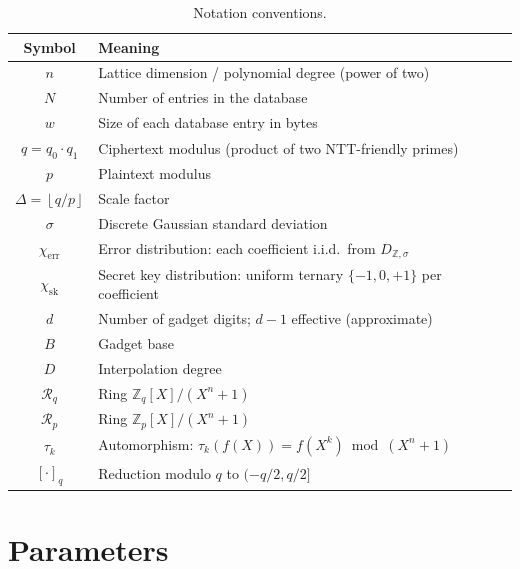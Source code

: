 \documentclass[11pt,a4paper]{article}
\newcommand{\Z}{\mathbb{Z}}
\newcommand{\R}{\mathcal{R}}
\newcommand{\Rq}{\R_{q}}
\newcommand{\Rp}{\R_{p}}
\newcommand{\floor}[1]{\left\lfloor #1 \right\rfloor}
\begin{document}
\begin{table}[ht]\centering
\caption{Notation conventions.}\label{tab:notation}
\begin{tabular}{@{}cl@{}}
\toprule
\textbf{Symbol} & \textbf{Meaning} \\
\midrule
$n$       & Lattice dimension / polynomial degree (power of two) \\
$N$       & Number of entries in the database \\
$w$       & Size of each database entry in bytes \\
$q = q_0 \cdot q_1$ & Ciphertext modulus (product of two NTT-friendly primes) \\
$p$       & Plaintext modulus \\
$\Delta = \floor{q/p}$ & Scale factor \\
$\sigma$  & Discrete Gaussian standard deviation \\
$\chi_{\mathrm{err}}$ & Error distribution: each coefficient i.i.d.\ from $D_{\mathbb{Z},\sigma}$ \\
$\chi_{\mathrm{sk}}$  & Secret key distribution: uniform ternary $\{-1,0,+1\}$ per coefficient \\
$d$       & Number of gadget digits; $d\!-\!1$ effective (approximate) \\
$B$       & Gadget base \\
$D$       & Interpolation degree \\
$\Rq$     & Ring $\Z_q[X]/(X^n+1)$ \\
$\Rp$     & Ring $\Z_p[X]/(X^n+1)$ \\
$\tau_k$  & Automorphism: $\tau_k(f(X)) = f(X^k) \bmod (X^n+1)$ \\
$[\cdot]_q$ & Reduction modulo $q$ to $(-q/2, q/2]$ \\
\bottomrule
\end{tabular}
\end{table}

\section{Parameters}\label{sec:params}
\end{document}

